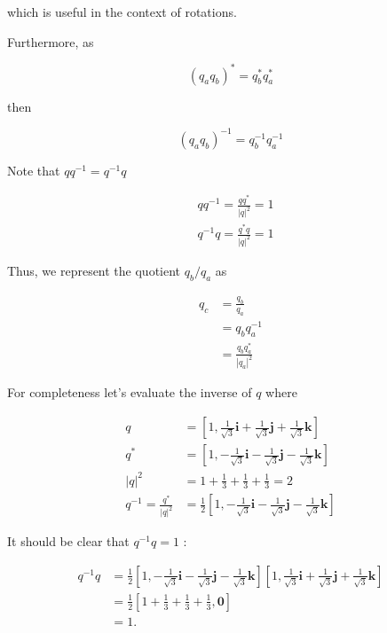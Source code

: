 which is useful in the context of rotations.

Furthermore, as

$$
\left(q_{a} q_{b}\right)^{*}=q_{b}^{*} q_{a}^{*}
$$

then

$$
\left(q_{a} q_{b}\right)^{-1}=q_{b}^{-1} q_{a}^{-1}
$$

Note that $q q^{-1}=q^{-1} q$

$$
\begin{aligned}
& q q^{-1}=\frac{q q^{*}}{|q|^{2}}=1 \\
& q^{-1} q=\frac{q^{*} q}{|q|^{2}}=1
\end{aligned}
$$

Thus, we represent the quotient $q_{b} / q_{a}$ as

$$
\begin{aligned}
q_{c} & =\frac{q_{b}}{q_{a}} \\
& =q_{b} q_{a}^{-1} \\
& =\frac{q_{b} q_{a}^{*}}{\left|q_{a}\right|^{2}}
\end{aligned}
$$

For completeness let's evaluate the inverse of $q$ where

$$
\begin{aligned}
q & =\left[1, \frac{1}{\sqrt{3}} \mathbf{i}+\frac{1}{\sqrt{3}} \mathbf{j}+\frac{1}{\sqrt{3}} \mathbf{k}\right] \\
q^{*} & =\left[1,-\frac{1}{\sqrt{3}} \mathbf{i}-\frac{1}{\sqrt{3}} \mathbf{j}-\frac{1}{\sqrt{3}} \mathbf{k}\right] \\
|q|^{2} & =1+\frac{1}{3}+\frac{1}{3}+\frac{1}{3}=2 \\
q^{-1}=\frac{q^{*}}{|q|^{2}} & =\frac{1}{2}\left[1,-\frac{1}{\sqrt{3}} \mathbf{i}-\frac{1}{\sqrt{3}} \mathbf{j}-\frac{1}{\sqrt{3}} \mathbf{k}\right]
\end{aligned}
$$

It should be clear that $q^{-1} q=1$ :

$$
\begin{aligned}
q^{-1} q & =\frac{1}{2}\left[1,-\frac{1}{\sqrt{3}} \mathbf{i}-\frac{1}{\sqrt{3}} \mathbf{j}-\frac{1}{\sqrt{3}} \mathbf{k}\right]\left[1, \frac{1}{\sqrt{3}} \mathbf{i}+\frac{1}{\sqrt{3}} \mathbf{j}+\frac{1}{\sqrt{3}} \mathbf{k}\right] \\
& =\frac{1}{2}\left[1+\frac{1}{3}+\frac{1}{3}+\frac{1}{3}, \mathbf{0}\right] \\
& =1 .
\end{aligned}
$$


